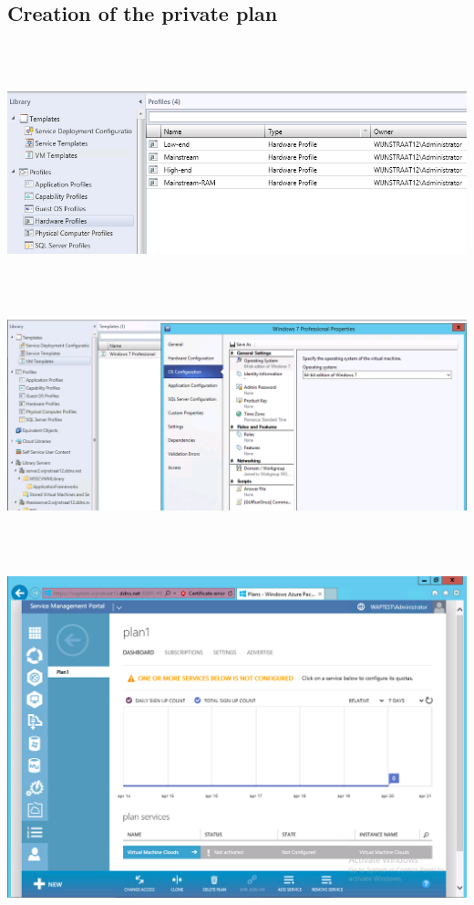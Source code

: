 \documentclass[11pt, a4paper]{article}
\begin{document}
\subsection{Creation of the private plan}
$\;$ \\ \\
\noindent\begin{minipage}{\textwidth}
    \centering
    \includegraphics[width=\textwidth]{Plan_2.png}
\end{minipage}
$\;$ \\ \\
\noindent\begin{minipage}{\textwidth}
    \centering
    \includegraphics[width=\textwidth]{Plan_3.png}
\end{minipage}
$\;$ \\ \\
\noindent\begin{minipage}{\textwidth}
    \centering
    \includegraphics[width=\textwidth]{Plan_1.png}
\end{minipage}
\end{document}
